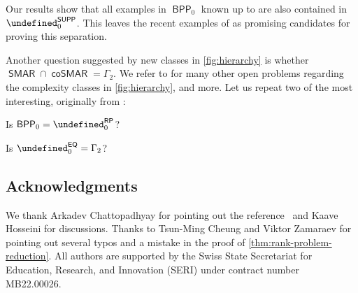 \documentclass{article}
\newcommand{\cplxclass}[1]{\mathsf{#1}}
\let\P\undefined\DeclareMathOperator{\P}{\cplxclass{P}}
\DeclareMathOperator{\BPP}{\cplxclass{BPP}}
\DeclareMathOperator{\SUPP}{\cplxclass{SUPP}}
\DeclareMathOperator{\RP}{\cplxclass{RP}}
\DeclareMathOperator{\SMAR}{\cplxclass{SMAR}}
\DeclareMathOperator{\coSMAR}{\cplxclass{coSMAR}}
\newcommand{\EQ}{\mathsf{EQ}}
\begin{document}
Our results show that all examples in $\BPP_0$ known up to \cite{FGHH25} are
also contained in $\P_0^{\SUPP}$. This leaves the recent examples of \cite{SS24}
as promising candidates for proving this separation.

Another question suggested by new classes in \cref{fig:hierarchy} is whether $\SMAR \cap \coSMAR = \Gamma_2$. We refer to \cite{HH24} for many other open problems regarding the complexity classes
in \cref{fig:hierarchy}, and more. Let us repeat two of the most interesting, originally from \cite{HHH22}:

\begin{question}
    Is  $\BPP_0 = \P_0^{\RP}$?
\end{question}

\begin{question}
    Is $\P_0^\EQ = \Gamma_2$?
\end{question}

\bigskip
\subsection*{Acknowledgments}
We thank Arkadev Chattopadhyay for pointing out the reference~\cite{HP2010} and
Kaave Hosseini for discussions. Thanks to Tsun-Ming Cheung and Viktor Zamaraev
for pointing out several typos and a mistake in the proof of
\cref{thm:rank-problem-reduction}. All authors are supported by the Swiss State
Secretariat for Education, Research, and Innovation (SERI) under contract number
MB22.00026.


\newpage

\renewcommand{\path}[1]{\small\Doi{#1}}
\renewcommand{\url}[1]{\href{#1}{\small\Doi{#1}}}


\end{document}

